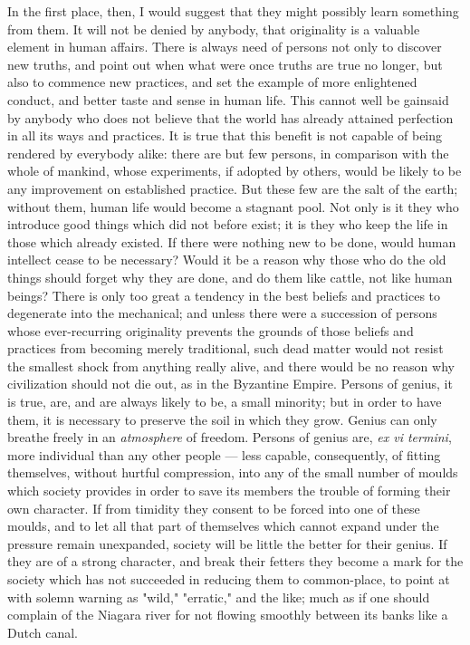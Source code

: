 \documentclass[12pt]{report}
\begin{document}
In the first place, then, I would suggest that they might possibly learn something from them. It will not be denied by anybody, that originality is a valuable element in human affairs. There is always need of persons not only to discover new truths, and point out when what were once truths are true no longer, but also to commence new practices, and set the example of more enlightened conduct, and better taste and sense in human life. This cannot well be gainsaid by anybody who does not believe that the world has already attained perfection in all its ways and practices. It is true that this benefit is not capable of being rendered by everybody alike: there are but few persons, in comparison with the whole of mankind, whose experiments, if adopted by others, would be likely to be any improvement on established practice. But these few are the salt of the earth; without them, human life would become a stagnant pool. Not only is it they who introduce good things which did not before exist; it is they who keep the life in those which already existed. If there were nothing new to be done, would human intellect cease to be necessary? Would it be a reason why those who do the old things should forget why they are done, and do them like cattle, not like human beings? There is only too great a tendency in the best beliefs and practices to degenerate into the mechanical; and unless there were a succession of persons whose ever-recurring originality prevents the grounds of those beliefs and practices from becoming merely traditional, such dead matter would not resist the smallest shock from anything really alive, and there would be no reason why civilization should not die out, as in the Byzantine Empire. Persons of genius, it is true, are, and are always likely to be, a small minority; but in order to have them, it is necessary to preserve the soil in which they grow. Genius can only breathe freely in an \emph{atmosphere} of freedom. Persons of genius are, \emph{ex vi termini}, more individual than any other people — less capable, consequently, of fitting themselves, without hurtful compression, into any of the small number of moulds which society provides in order to save its members the trouble of forming their own character. If from timidity they consent to be forced into one of these moulds, and to let all that part of themselves which cannot expand under the pressure remain unexpanded, society will be little the better for their genius. If they are of a strong character, and break their fetters they become a mark for the society which has not succeeded in reducing them to common-place, to point at with solemn warning as "wild," "erratic," and the like; much as if one should complain of the Niagara river for not flowing smoothly between its banks like a Dutch canal.
\end{document}
